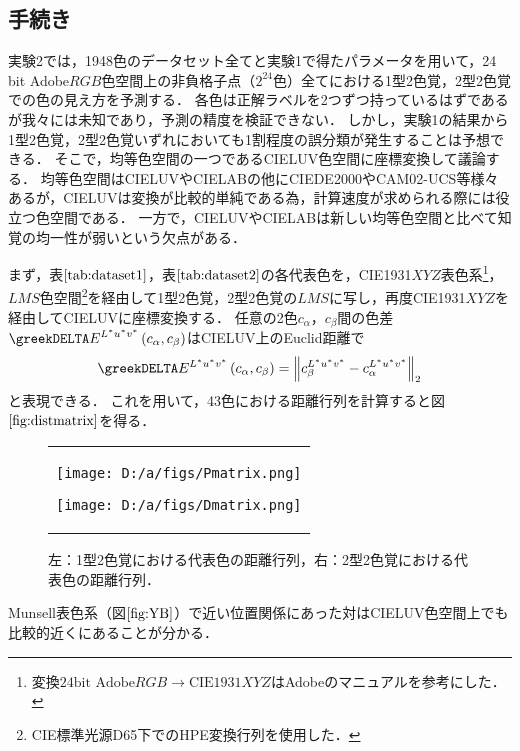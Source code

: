 \documentclass[uplatex,paper=a4,fontsize=4.0truemm,jafontsize=4.0truemm,head_space=30.0truemm,foot_space=30.0truemm,baselineskip=8.0truemm,line_length=40zw,gutter=25.0truemm,oneside,openany,fleqn,hanging_panctuation,open_bracket_pos=nibu_tentsuki,dvipdfmx,jis2004,book,titlepage]{jlreq}
\theoremstyle{mystyle}
\newcommand{\captiondot}[1]{\caption{#1．}}
\newcommand{\mathdisplaystyle}[1]{\(\displaystyle{#1}\)}
\newcommand{\Reference}[1]{\mathdisplaystyle{\ref{#1}}}
\newcommand{\parentheses}[1]{\left(#1\right)}
\newcommand{\norm}[2]{{\left\lVert#1\right\rVert}_{#2}}
\begin{document}
			\subsection{手続き}
				実験2では，1948色のデータセット全てと実験1で得たパラメータを用いて，24 bit Adobe\mathdisplaystyle{RGB}色空間上の非負格子点（\mathdisplaystyle{2^{24}}色）全てにおける1型2色覚，2型2色覚での色の見え方を予測する．
				各色は正解ラベルを2つずつ持っているはずであるが我々には未知であり，予測の精度を検証できない．
				しかし，実験1の結果から1型2色覚，2型2色覚いずれにおいても1割程度の誤分類が発生することは予想できる．
				そこで，均等色空間の一つであるCIELUV色空間に座標変換して議論する．
				均等色空間はCIELUVやCIELABの他にCIEDE2000やCAM02-UCS等様々ある\cite{Yaguchi2017b}が，CIELUVは変換が比較的単純である為，計算速度が求められる際には役立つ色空間である．
				一方で，CIELUVやCIELABは新しい均等色空間と比べて知覚の均一性が弱いという欠点がある\cite[p.~10]{Robertson1977}．

				まず，表\Reference{tab:dataset1}，表\Reference{tab:dataset2}の各代表色を，CIE1931\mathdisplaystyle{XYZ}表色系\footnote{変換\mathdisplaystyle{\textrm{24bit Adobe}RGB\to\textrm{CIE1931}XYZ}はAdobe\textregistered のマニュアル\cite{Adobe2005}を参考にした．}，\mathdisplaystyle{LMS}色空間\footnote{CIE標準光源D65下でのHPE変換行列を使用した．}を経由して1型2色覚，2型2色覚の\mathdisplaystyle{LMS}に写し，再度CIE1931\mathdisplaystyle{XYZ}を経由してCIELUVに座標変換する．
				任意の2色\mathdisplaystyle{c_\alpha}，\mathdisplaystyle{c_\beta}間の色差\mathdisplaystyle{\greekDELTA E^{L^\ast u^\ast v^\ast}\parentheses{c_\alpha,c_\beta}}はCIELUV上のEuclid距離で
				\begin{equation*}
					\greekDELTA E^{L^\ast u^\ast v^\ast}\parentheses{c_\alpha,c_\beta}=\norm{c_\beta^{L^\ast u^\ast v^\ast}-c_\alpha^{L^\ast u^\ast v^\ast}}{2}
				\end{equation*}
				と表現できる．
				これを用いて，43色における距離行列を計算すると図\Reference{fig:distmatrix}を得る．
				\begin{figure}[tbp]
					\centering
					\begin{tabular}{c}
						\begin{minipage}{0.5\linewidth}
							\centering
							\texttt{[image: D:/a/figs/Pmatrix.png]}
						\end{minipage}
						\begin{minipage}{0.5\linewidth}
							\centering
							\texttt{[image: D:/a/figs/Dmatrix.png]}
						\end{minipage}
					\end{tabular}
					\captiondot{左：1型2色覚における代表色の距離行列，右：2型2色覚における代表色の距離行列}\label{fig:distmatrix}
				\end{figure}
				Munsell表色系（図\Reference{fig:YB}）で近い位置関係にあった対はCIELUV色空間上でも比較的近くにあることが分かる．
\end{document}
